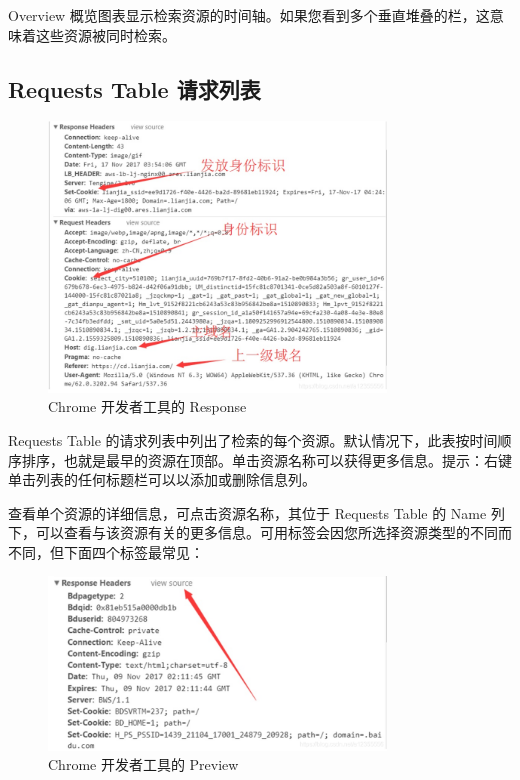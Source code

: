 Overview 概览图表显示检索资源的时间轴。如果您看到多个垂直堆叠的栏，这意味着这些资源被同时检索。

\subsection{Requests Table 请求列表}

\begin{figure}[htb]
\centering 
\includegraphics[width=0.80\textwidth]{img/newch1m11.png} 
\caption{Chrome 开发者工具的 Response}
\label{Test}
\end{figure}

Requests Table 的请求列表中列出了检索的每个资源。默认情况下，此表按时间顺序排序，也就是最早的资源在顶部。单击资源名称可以获得更多信息。提示：右键单击列表的任何标题栏可以以添加或删除信息列。

查看单个资源的详细信息，可点击资源名称，其位于 Requests Table 的 Name 列下，可以查看与该资源有关的更多信息。可用标签会因您所选择资源类型的不同而不同，但下面四个标签最常见：

\begin{figure}[htb]
\centering 
\includegraphics[width=0.80\textwidth]{img/newch1m12.png} 
\caption{Chrome 开发者工具的 Preview}
\label{Test}
\end{figure}


